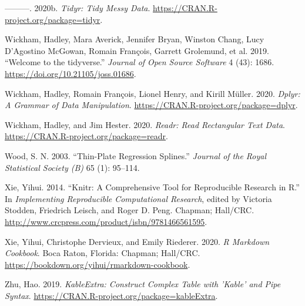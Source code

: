 \documentclass{article}
\begin{document}
\leavevmode\hypertarget{ref-tidyr}{}%
---------. 2020b. \emph{Tidyr: Tidy Messy Data}. \url{https://CRAN.R-project.org/package=tidyr}.

\leavevmode\hypertarget{ref-tidyverse}{}%
Wickham, Hadley, Mara Averick, Jennifer Bryan, Winston Chang, Lucy D'Agostino McGowan, Romain François, Garrett Grolemund, et al. 2019. ``Welcome to the tidyverse.'' \emph{Journal of Open Source Software} 4 (43): 1686. \url{https://doi.org/10.21105/joss.01686}.

\leavevmode\hypertarget{ref-dplyr}{}%
Wickham, Hadley, Romain François, Lionel Henry, and Kirill Müller. 2020. \emph{Dplyr: A Grammar of Data Manipulation}. \url{https://CRAN.R-project.org/package=dplyr}.

\leavevmode\hypertarget{ref-readr}{}%
Wickham, Hadley, and Jim Hester. 2020. \emph{Readr: Read Rectangular Text Data}. \url{https://CRAN.R-project.org/package=readr}.

\leavevmode\hypertarget{ref-mgcv}{}%
Wood, S. N. 2003. ``Thin-Plate Regression Splines.'' \emph{Journal of the Royal Statistical Society (B)} 65 (1): 95--114.

\leavevmode\hypertarget{ref-knitr}{}%
Xie, Yihui. 2014. ``Knitr: A Comprehensive Tool for Reproducible Research in R.'' In \emph{Implementing Reproducible Computational Research}, edited by Victoria Stodden, Friedrich Leisch, and Roger D. Peng. Chapman; Hall/CRC. \url{http://www.crcpress.com/product/isbn/9781466561595}.

\leavevmode\hypertarget{ref-rmarkdown}{}%
Xie, Yihui, Christophe Dervieux, and Emily Riederer. 2020. \emph{R Markdown Cookbook}. Boca Raton, Florida: Chapman; Hall/CRC. \url{https://bookdown.org/yihui/rmarkdown-cookbook}.

\leavevmode\hypertarget{ref-kableExtra}{}%
Zhu, Hao. 2019. \emph{KableExtra: Construct Complex Table with 'Kable' and Pipe Syntax}. \url{https://CRAN.R-project.org/package=kableExtra}.



\end{document}

